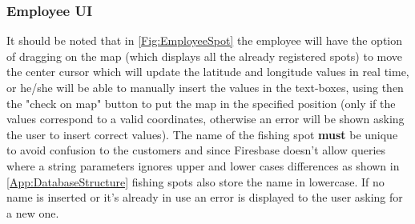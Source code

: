 \subsubsection{Employee UI}
It should be noted that in \autoref{Fig:EmployeeSpot} the employee will have the option of dragging on the map (which displays all the already registered spots) to move the center cursor which will update the latitude and longitude values in real time, or he/she will be able to manually insert the values in the text-boxes, using then the "check on map" button to put the map in the specified position (only if the values correspond to a valid coordinates, otherwise an error will be shown asking the user to insert correct values). The name of the fishing spot \textbf{must} be unique to avoid confusion to the customers and since Firesbase doesn't allow queries where a string parameters ignores upper and lower cases differences as shown in \autoref{App:DatabaseStructure} fishing spots also store the name in lowercase. If no name is inserted or it's already in use an error is displayed to the user asking for a new one.
